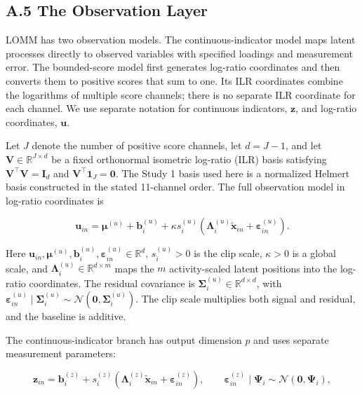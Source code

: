 \documentclass[
]{article}
\begin{document}
\subsection{A.5 The Observation Layer}\label{a.5-the-observation-layer}

LOMM has two observation models. The continuous-indicator model maps
latent processes directly to observed variables with specified loadings
and measurement error. The bounded-score model first generates log-ratio
coordinates and then converts them to positive scores that sum to one.
Its ILR coordinates combine the logarithms of multiple score channels;
there is no separate ILR coordinate for each channel. We use separate
notation for continuous indicators, \(\mathbf z\), and log-ratio
coordinates, \(\mathbf u\).

Let \(J\) denote the number of positive score channels, let \(d=J-1\),
and let \(\mathbf V\in\mathbb R^{J\times d}\) be a fixed orthonormal
isometric log-ratio (ILR) basis satisfying
\(\mathbf V^\top\mathbf V=\mathbf I_d\) and
\(\mathbf V^\top\mathbf 1_J=\mathbf 0\). The Study 1 basis used here is
a normalized Helmert basis constructed in the stated 11-channel order.
The full observation model in log-ratio coordinates is

\[
\mathbf u_{in}
=
\boldsymbol\mu^{(u)}+\mathbf b_i^{(u)}
+\kappa s_i^{(u)}
\left(
\boldsymbol\Lambda_i^{(u)}\tilde{\mathbf x}_{in}
+\boldsymbol\varepsilon_{in}^{(u)}
\right).
\]

Here
\(\mathbf u_{in},\boldsymbol\mu^{(u)},\mathbf b_i^{(u)},\boldsymbol\varepsilon_{in}^{(u)}\in\mathbb R^d\),
\(s_i^{(u)}>0\) is the clip scale, \(\kappa>0\) is a global scale, and
\(\boldsymbol\Lambda_i^{(u)}\in\mathbb R^{d\times m}\) maps the \(m\)
activity-scaled latent positions into the log-ratio coordinates. The
residual covariance is
\(\boldsymbol\Sigma_i^{(u)}\in\mathbb R^{d\times d}\), with
\(\boldsymbol\varepsilon_{in}^{(u)}\mid\boldsymbol\Sigma_i^{(u)}\sim\mathcal N(\mathbf 0,\boldsymbol\Sigma_i^{(u)})\).
The clip scale multiplies both signal and residual, and the baseline is
additive.

The continuous-indicator branch has output dimension \(p\) and uses
separate measurement parameters:

\[
\mathbf z_{in}
=
\mathbf b_i^{(z)}
+s_i^{(z)}
\left(
\boldsymbol\Lambda_i^{(z)}\tilde{\mathbf x}_{in}
+\boldsymbol\varepsilon_{in}^{(z)}
\right),
\qquad
\boldsymbol\varepsilon_{in}^{(z)}\mid\boldsymbol\Psi_i
\sim\mathcal N(\mathbf 0,\boldsymbol\Psi_i),
\]
\end{document}
